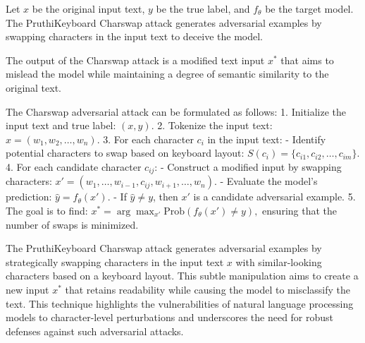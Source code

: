 Let \( x \) be the original input text, \( y \) be the true label, and \( f_{\theta} \) be the target model. The PruthiKeyboard Charswap attack generates adversarial examples by swapping characters in the input text to deceive the model.

The output of the Charswap attack is a modified text input \( x^* \) that aims to mislead the model while maintaining a degree of semantic similarity to the original text.

The Charswap adversarial attack can be formulated as follows:
1. Initialize the input text and true label:
   $
   (x, y).
   $
2. Tokenize the input text:
   $
   x = (w_1, w_2, \ldots, w_n).
   $
3. For each character \( c_i \) in the input text:
   - Identify potential characters to swap based on keyboard layout:
   $
   S(c_i) = \{c_{i1}, c_{i2}, \ldots, c_{im}\}.
   $
4. For each candidate character \( c_{ij} \):
   - Construct a modified input by swapping characters:
   $
   x' = (w_1, \ldots, w_{i-1}, c_{ij}, w_{i+1}, \ldots, w_n).
   $
   - Evaluate the model's prediction:
   $
   \hat{y} = f_{\theta}(x').
   $
   - If \( \hat{y} \neq y \), then \( x' \) is a candidate adversarial example.
5. The goal is to find:
   $
   x^* = \arg\max_{x'} \text{Prob}(f_{\theta}(x') \neq y),
   $
   ensuring that the number of swaps is minimized.

The PruthiKeyboard Charswap attack generates adversarial examples by strategically swapping characters in the input text \( x \) with similar-looking characters based on a keyboard layout. This subtle manipulation aims to create a new input \( x^* \) that retains readability while causing the model to misclassify the text. This technique highlights the vulnerabilities of natural language processing models to character-level perturbations and underscores the need for robust defenses against such adversarial attacks.
